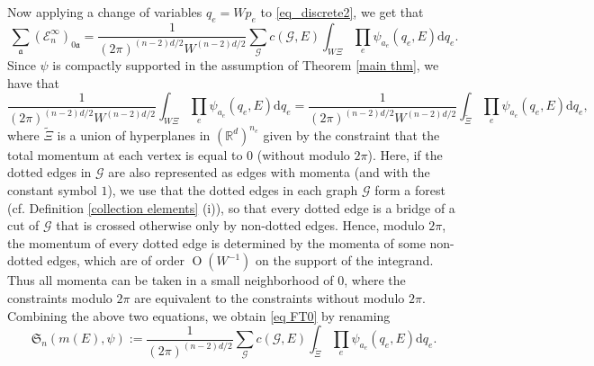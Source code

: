 \documentclass{article}
\newcommand{\1}{\mathds{1}}
\numberwithin{equation}{section}
\newcommand{\be}{\begin{equation}}
\newcommand{\ee}{\end{equation}}
\newcommand{\fa}{{\mathfrak a}}
\renewcommand{\cal}{\mathcal}
\newcommand{\wt}{\widetilde}
\newcommand{\dd}{\mathrm{d}}
\newcommand{\R}{\mathbb{R}}
\DeclareMathOperator{\OO}{O}
\theoremstyle{plain} %
\theoremstyle{remark}
\newcommand{\cor}{\color{red}}
\newcommand{\Seleinf}{{\mathcal E}^{\infty}}
\newcommand{\Sint}{\mathfrak S}
\begin{document}
	
Now applying a change of variables $q_e=Wp_e$ to \eqref{eq_discrete2}, we get that 
$$\sum_{\fa} (\Seleinf_{n})_{0\fa }=\frac{1}{(2\pi)^{(n-2) d/2}W^{(n-2) d/2}}\sum_{\cal G}c(\cal G, E)\int_{W\Xi}\prod_{e}\psi_{ a_e}(q_e, E) \dd q_e .$$
Since $\psi$ is compactly supported in the assumption of Theorem \ref{main thm}, we have that 
\be\label{psi_compact}\frac{1}{(2\pi)^{(n-2) d/2}W^{(n-2) d/2}}\int_{W\Xi}\prod_{e}\psi_{ a_e}(q_e, E) \dd q_e =\frac{1}{(2\pi)^{(n-2) d/2}W^{(n-2) d/2}}\int_{\wt\Xi }\prod_{e}\psi_{ a_e}(q_e, E) \dd q_e ,\ee
where $\wt\Xi$  is a union of hyperplanes in $(\R^d)^{n_e}$ given by the constraint that the total momentum at each vertex is equal to 0 (without modulo $2\pi$). Here, if the dotted edges in $\cal G$ are also represented as edges with momenta (and with the constant symbol $1$), we use that the dotted edges in each graph $\cal G$ form a forest (cf. Definition \ref{collection elements} (i)), so that every dotted edge is a bridge of a cut of $\cal G$ that is crossed otherwise only by non-dotted edges. Hence, modulo $2\pi$, the momentum of every dotted edge is determined by the momenta of some non-dotted edges, which are of order $\OO(W^{-1})$ on the support of the integrand. Thus all momenta can be taken in a small neighborhood of $0$, where the constraints modulo $2\pi$ are equivalent to the constraints without modulo $2\pi$.
Combining the above two equations, 	we obtain  \eqref{eq FT0} by renaming
$$\Sint_{n}(m(E), \psi) :=\frac{1}{(2\pi)^{(n-2) d/2} }\sum_{\cal G}c(\cal G,E)\int_{\wt\Xi}\prod_{e}\psi_{ a_e}(q_e, E) \dd q_e .$$
\end{document}
